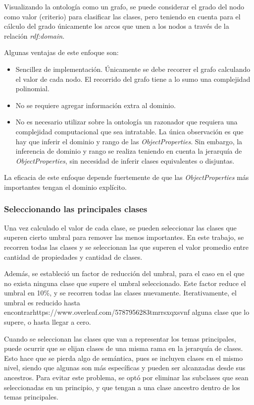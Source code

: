 Visualizando la ontología como un grafo, se puede considerar el grado del nodo como valor (criterio) para clasificar las clases, pero teniendo en cuenta para el cálculo del grado únicamente los arcos que  unen a los nodos a través de la relación \emph{rdf:domain}.

Algunas ventajas de este enfoque son:
\begin{itemize}
    \item Sencillez de implementación. Únicamente se debe recorrer el grafo calculando el valor de cada nodo. El recorrido del grafo tiene a lo sumo una complejidad polinomial.
    \item No se requiere agregar información extra al dominio.
    \item No es necesario utilizar sobre la ontología un razonador que requiera una complejidad computacional que sea intratable. La única observación es que hay que inferir el dominio y rango de las \emph{ObjectProperties}. Sin embargo, la inferencia de dominio y rango se realiza teniendo en cuenta la jerarquía de \emph{ObjectProperties}, sin necesidad de inferir clases equivalentes o disjuntas.
\end{itemize}

La eficacia de este enfoque depende fuertemente de que las \emph{ObjectProperties} más importantes tengan el dominio explícito.


\subsubsection{Seleccionando las principales clases}
\label{sec:select_class}
Una vez calculado el valor de cada clase, se pueden seleccionar las clases que superen cierto umbral para remover las menos importantes. En este trabajo, se recorren todas las clases y se seleccionan las que superen el valor promedio entre cantidad de propiedades y cantidad de clases.

Además, se estableció un factor de reducción del umbral, para el caso en el que no exista ninguna clase que supere el umbral seleccionado. Este factor reduce el umbral en 10\%, y se recorren todas las clases nuevamente. Iterativamente, el umbral es reducido hasta encontrarhttps://www.overleaf.com/5787956283tmrrsxqxsvnf alguna clase que lo supere, o hasta llegar a cero.

Cuando se seleccionan las clases que van a representar los temas principales, puede ocurrir que se elijan clases de una misma rama en la jerarquía de clases. Esto hace que se pierda algo de semántica, pues se incluyen clases en el mismo nivel, siendo que algunas son más específicas y pueden ser alcanzadas desde sus ancestros. Para evitar este problema, se optó por eliminar las subclases que sean seleccionadas en un principio, y que tengan a una clase ancestro dentro de los temas principales.

